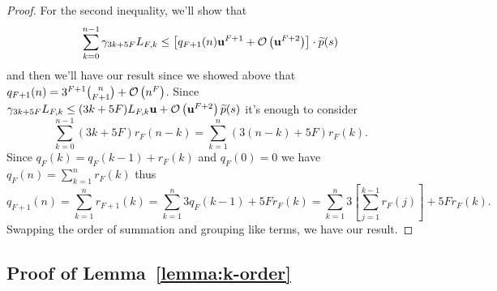 \begin{proof}
For the second inequality, we'll show that
\begin{equation}
\sum_{k = 0}^{n - 1} \gamma_{3k + 5F} L_{F, k} \leq
  \left[q_{F + 1}(n) \mathbf{u}^{F + 1} +
  \mathcal{O}\left(\mathbf{u}^{F + 2}\right)\right] \cdot \widetilde{p}(s)
\end{equation}
and then we'll have our result since we showed above that
\(q_{F + 1}(n) = 3^{F + 1} \binom{n}{F + 1} + \mathcal{O}\left(n^F\right)\). Since
\(\gamma_{3k + 5F} L_{F, k} \leq (3k + 5F) L_{F, k} \mathbf{u} +
\mathcal{O}\left(\mathbf{u}^{F + 2}\right) \widetilde{p}(s)\) it's enough to consider
\begin{equation}
\sum_{k = 0}^{n - 1} (3k + 5F) r_F(n - k) =
\sum_{k = 1}^n (3(n - k) + 5F) r_F(k).
\end{equation}
Since \(q_F(k) = q_F(k - 1) + r_F(k)\) and \(q_F(0) = 0\) we have
\(q_{F}(n) = \sum_{k = 1}^n r_{F}(k)\) thus
\begin{equation}
q_{F + 1}(n) = \sum_{k = 1}^n r_{F + 1}(k)
= \sum_{k = 1}^n 3 q_F(k - 1) + 5 F r_F(k)
= \sum_{k = 1}^n 3 \left[\sum_{j = 1}^{k - 1} r_F(j)\right] + 5 F r_F(k).
\end{equation}
Swapping the order of summation and grouping like terms, we have our
result.
\end{proof}

\subsection{Proof of Lemma~\ref{lemma:k-order}}\label{proof:k-order}

